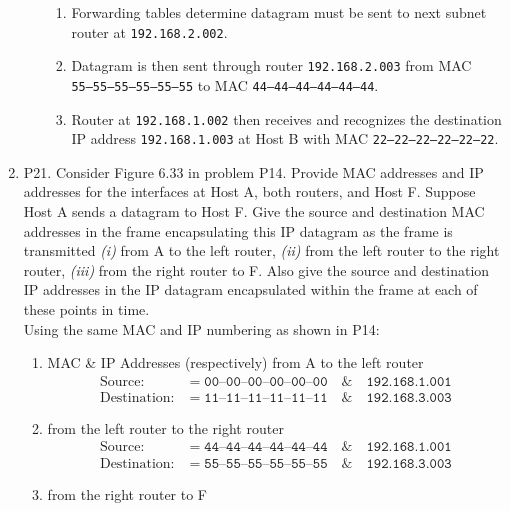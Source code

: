 \documentclass[12pt]{article}
\begin{document}
\begin{enumerate}
\begin{enumerate}
\begin{enumerate}
            \item Forwarding tables determine datagram must be sent to next subnet router at \texttt{192.168.2.002}.
            \item Datagram is then sent through router \texttt{192.168.2.003} from MAC\\ \texttt{55--55--55--55--55--55} to MAC \texttt{44--44--44--44--44--44}.
            \item Router at \texttt{192.168.1.002} then receives and recognizes the destination IP address \texttt{192.168.1.003} at Host B with MAC \texttt{22--22--22--22--22--22}.
        \end{enumerate}
    \end{enumerate}
    \newpage
    \item P21. Consider Figure 6.33 in problem P14. Provide MAC addresses and IP addresses for the interfaces at Host A, both routers, and Host F. Suppose Host A sends a datagram to Host F. Give the source and destination MAC addresses in the frame encapsulating this IP datagram as the frame is transmitted \textit{(i)} from A to the left router, \textit{(ii)} from the left router to the right router, \textit{(iii)} from the right router to F. Also give the source and destination IP addresses in the IP datagram encapsulated within the frame at each of these points in time.\\[1em]
    Using the same MAC and IP numbering as shown in P14:
    \begin{enumerate}[label= (\roman{*})]
        \item MAC \& IP Addresses (respectively) from A to the left router
        \begin{align*}
            \text{Source:} &=\texttt{00--00--00--00--00--00}\quad \& \quad \texttt{192.168.1.001}\\
            \text{Destination:} &=\texttt{11--11--11--11--11--11}\quad \&\quad\texttt{192.168.3.003}
        \end{align*}
        \item from the left router to the right router
        \begin{align*}
            \text{Source:} &=\texttt{44--44--44--44--44--44}\quad \& \quad \texttt{192.168.1.001}\\
            \text{Destination:} &=\texttt{55--55--55--55--55--55}\quad \&\quad\texttt{192.168.3.003}
        \end{align*}
        \item from the right router to F
        \begin{align*}

\end{align*}
\end{enumerate}
\end{enumerate}
\end{document}
